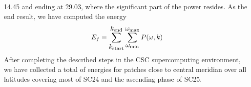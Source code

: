 \documentclass{aa}
\begin{document}
14.45 and ending at 29.03, 
where the significant part of the \fff power resides. 
As the end result, we have computed the \fff energy
\begin{equation}
E_f=
\sum_{\mbox{$k_{\rm start}$}}^{\mbox{$k_{\rm end}$}}
\sum_{\mbox{$\omega_{\rm min}$}}^{\mbox{$\omega_{\rm max}$}} P(\omega,k)
\end{equation}
After completing the described steps in the CSC supercomputing
environment, we have collected a total of  \fff 
energies
for patches close to central meridian over all latitudes covering 
most of SC24 and the ascending phase of SC25.

\end{document}
